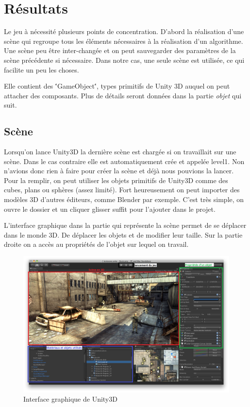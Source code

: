 \documentclass[a4paper,11pt]{myreport}
\begin{document}
\newpage

\chapter{Résultats}
\par Le jeu à nécessité plusieurs points de concentration. D'abord la réalisation d'une scène qui regroupe tous les éléments nécessaires à la réalisation d'un algorithme. Une scène peu être inter-changée et on peut sauvegarder des paramètres de la scène précédente si nécessaire. Dans notre cas, une seule scène est utilisée, ce qui facilite un peu les choses. 
\par Elle contient des \''GameObject\'', types primitifs de Unity 3D auquel on peut attacher des composants. Plus de détails seront données dans la partie \textit{objet} qui suit.
	\section{Scène}
	\par Lorsqu'on lance Unity3D la dernière scène est chargée si on travaillait sur une scène. Dans le cas contraire elle est automatiquement crée et appelée level1. Non n'avions donc rien à faire pour créer la scène et déjà nous pouvions la lancer.
	Pour la remplir, on peut utiliser les objets primitifs de Unity3D comme des cubes, plans ou sphères (assez limité). Fort heureusement on peut importer des modèles 3D d'autres éditeurs, comme Blender par exemple. C'est très simple, on ouvre le dossier et un cliquer glisser suffit pour l'ajouter dans le projet.
	\par L'interface graphique dans la partie qui représente la scène permet de se déplacer dans le monde 3D. De déplacer les objets et de modifier leur taille.
	Sur la partie droite on a accès au propriétés de l'objet sur lequel on travail.
	\begin{figure}[h]
	\includegraphics[scale=0.45]{./images/unity-3D_interface.png}
	\caption{Interface graphique de Unity3D}
	\end{figure}
	
\end{document}
